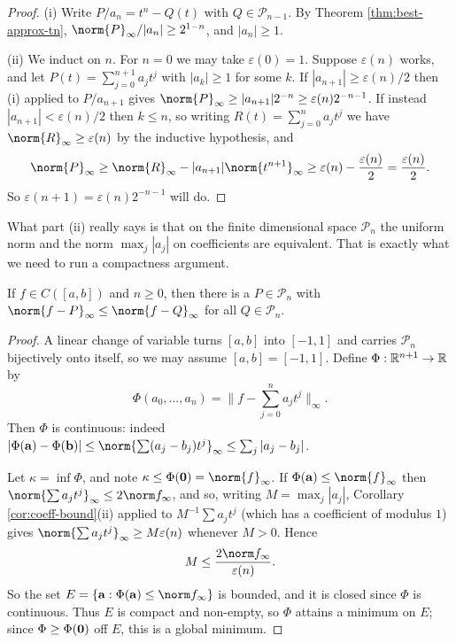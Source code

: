 \documentclass[a4paper]{scrartcl}
\newcommand{\Pn}{\mathcal{P}}
\begin{document}
\begin{proof}
	(i) Write $P/a_n = t^n - Q(t)$ with $Q \in \Pn_{n-1}$. By Theorem \ref{thm:best-approx-tn}, $\norm{P}_\infty/|a_n| \geq 2^{1-n}$, and $|a_n|\geq1$.

	(ii) We induct on $n$. For $n = 0$ we may take $\varepsilon(0)=1$. Suppose $\varepsilon(n)$ works, and let $P(t) = \sum_{j=0}^{n+1}a_jt^j$ with $|a_k|\geq1$ for some $k$. If $|a_{n+1}|\geq \varepsilon(n)/2$ then (i) applied to $P/a_{n+1}$ gives $\norm{P}_\infty\geq|a_{n+1}|2^{-n}\geq\varepsilon(n)2^{-n-1}$. If instead $|a_{n+1}|<\varepsilon(n)/2$ then $k\leq n$, so writing $R(t) = \sum_{j=0}^n a_jt^j$ we have $\norm{R}_\infty\geq\varepsilon(n)$ by the inductive hypothesis, and
	$$\norm{P}_\infty \geq \norm{R}_\infty - |a_{n+1}|\norm{t^{n+1}}_\infty \geq \varepsilon(n)-\frac{\varepsilon(n)}{2} = \frac{\varepsilon(n)}{2}.$$
	So $\varepsilon(n+1) = \varepsilon(n)2^{-n-1}$ will do.
\end{proof}

What part (ii) really says is that on the finite dimensional space $\Pn_n$ the uniform norm and the norm $\max_j|a_j|$ on coefficients are equivalent. That is exactly what we need to run a compactness argument.

\begin{theorem}\label{thm:best-exists}
	If $f\in C([a,b])$ and $n\geq0$, then there is a $P\in\Pn_n$ with $\norm{f-P}_\infty\leq\norm{f-Q}_\infty$ for all $Q\in\Pn_n$.
\end{theorem}

\begin{proof}
	A linear change of variable turns $[a,b]$ into $[-1,1]$ and carries $\Pn_n$ bijectively onto itself, so we may assume $[a,b]=[-1,1]$. Define $\Phi : \mathbb{R}^{n+1}\to\mathbb{R}$ by
	$$\Phi(a_0,\ldots,a_n) = \Big\lVert f - \sum_{j=0}^n a_jt^j\Big\rVert_\infty.$$
	Then $\Phi$ is continuous: indeed $|\Phi(\vv{a})-\Phi(\vv{b})| \leq \norm{\sum(a_j-b_j)t^j}_\infty \leq \sum_j|a_j-b_j|$.

	Let $\kappa = \inf\Phi$, and note $\kappa\leq\Phi(\vv{0}) = \norm{f}_\infty$. If $\Phi(\vv{a})\leq\norm{f}_\infty$ then $\norm{\sum a_jt^j}_\infty \leq 2\norm f_\infty$, and so, writing $M = \max_j|a_j|$, Corollary \ref{cor:coeff-bound}(ii) applied to $M^{-1}\sum a_jt^j$ (which has a coefficient of modulus $1$) gives $\norm{\sum a_jt^j}_\infty\geq M\varepsilon(n)$ whenever $M > 0$. Hence
	$$M \leq \frac{2\norm f_\infty}{\varepsilon(n)}.$$
	So the set $E = \{\vv{a} : \Phi(\vv{a})\leq\norm f_\infty\}$ is bounded, and it is closed since $\Phi$ is continuous. Thus $E$ is compact and non-empty, so $\Phi$ attains a minimum on $E$; since $\Phi \geq \Phi(\mathbf{0})$ off $E$, this is a global minimum.
\end{proof}
\end{document}
